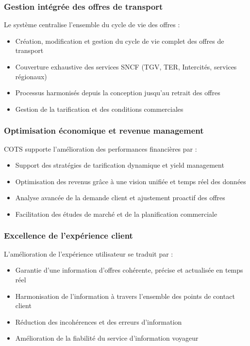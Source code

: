 \subsubsection{Gestion intégrée des offres de transport}
Le système centralise l'ensemble du cycle de vie des offres :
\begin{itemize}
    \item Création, modification et gestion du cycle de vie complet des offres de transport
    \item Couverture exhaustive des services SNCF (TGV, TER, Intercités, services régionaux)
    \item Processus harmonisés depuis la conception jusqu'au retrait des offres
    \item Gestion de la tarification et des conditions commerciales
\end{itemize}

\subsubsection{Optimisation économique et revenue management}
COTS supporte l'amélioration des performances financières par :
\begin{itemize}
    \item Support des stratégies de tarification dynamique et yield management
    \item Optimisation des revenus grâce à une vision unifiée et temps réel des données
    \item Analyse avancée de la demande client et ajustement proactif des offres
    \item Facilitation des études de marché et de la planification commerciale
\end{itemize}

\subsubsection{Excellence de l'expérience client}
L'amélioration de l'expérience utilisateur se traduit par :
\begin{itemize}
    \item Garantie d'une information d'offres cohérente, précise et actualisée en temps réel
    \item Harmonisation de l'information à travers l'ensemble des points de contact client
    \item Réduction des incohérences et des erreurs d'information
    \item Amélioration de la fiabilité du service d'information voyageur
\end{itemize}


